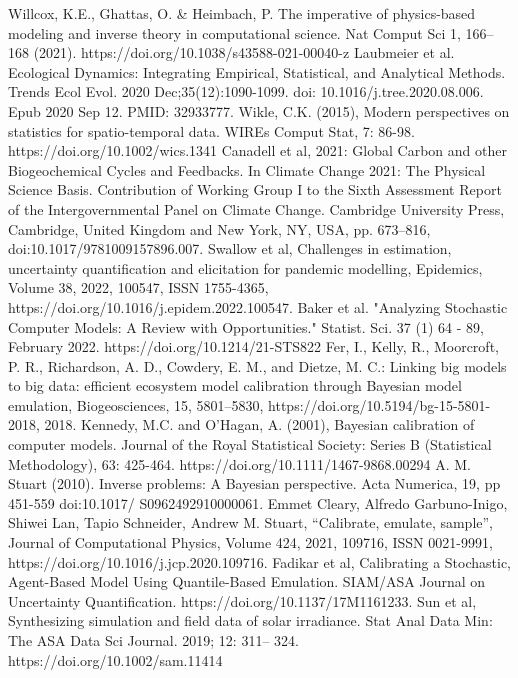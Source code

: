 \documentclass[11pt]{article}
\begin{document}
\begin{thebibliography}{20}
 Willcox, K.E., Ghattas, O. \& Heimbach, P. The imperative of physics-based modeling and inverse theory in computational science. Nat Comput Sci 1, 166–168 (2021). https://doi.org/10.1038/s43588-021-00040-z
 Laubmeier et al. Ecological Dynamics: Integrating Empirical, Statistical, and Analytical Methods. Trends Ecol Evol. 2020 Dec;35(12):1090-1099. doi: 10.1016/j.tree.2020.08.006. Epub 2020 Sep 12. PMID: 32933777.
 Wikle, C.K. (2015), Modern perspectives on statistics for spatio-temporal data. WIREs Comput Stat, 7: 86-98. https://doi.org/10.1002/wics.1341
 Canadell et al, 2021: Global Carbon and
other Biogeochemical Cycles and Feedbacks. In Climate Change 2021: The Physical Science Basis. Contribution of
Working Group I to the Sixth Assessment Report of the Intergovernmental Panel on Climate Change. Cambridge University Press,
Cambridge, United Kingdom and New York, NY, USA, pp. 673–816, doi:10.1017/9781009157896.007.
 Swallow et al, Challenges in estimation, uncertainty quantification and elicitation for pandemic modelling, Epidemics, Volume 38, 2022, 100547, ISSN 1755-4365, https://doi.org/10.1016/j.epidem.2022.100547.
 Baker et al. "Analyzing Stochastic Computer Models: A Review with Opportunities." Statist. Sci. 37 (1) 64 - 89, February 2022. https://doi.org/10.1214/21-STS822
 Fer, I., Kelly, R., Moorcroft, P. R., Richardson, A. D., Cowdery, E. M., and Dietze, M. C.: Linking big models to big data: efficient ecosystem model calibration through Bayesian model emulation, Biogeosciences, 15, 5801–5830, https://doi.org/10.5194/bg-15-5801-2018, 2018.
 Kennedy, M.C. and O'Hagan, A. (2001), Bayesian calibration of computer models. Journal of the Royal Statistical Society: Series B (Statistical Methodology), 63: 425-464. https://doi.org/10.1111/1467-9868.00294
 A. M. Stuart (2010). Inverse problems: A Bayesian perspective. Acta Numerica, 19, pp 451-559 doi:10.1017/
S0962492910000061.
 Emmet Cleary, Alfredo Garbuno-Inigo, Shiwei Lan, Tapio Schneider, Andrew M. Stuart, “Calibrate, emulate, sample”, Journal of Computational Physics, Volume 424, 2021, 109716, ISSN 0021-9991, https://doi.org/10.1016/j.jcp.2020.109716.
 Fadikar et al, Calibrating a Stochastic, Agent-Based Model Using Quantile-Based Emulation. SIAM/ASA Journal on Uncertainty Quantification. https://doi.org/10.1137/17M1161233.
 Sun et al, Synthesizing simulation and field data of solar irradiance. Stat Anal Data Min: The ASA Data Sci Journal. 2019; 12: 311– 324. https://doi.org/10.1002/sam.11414

\end{thebibliography}
\end{document}
